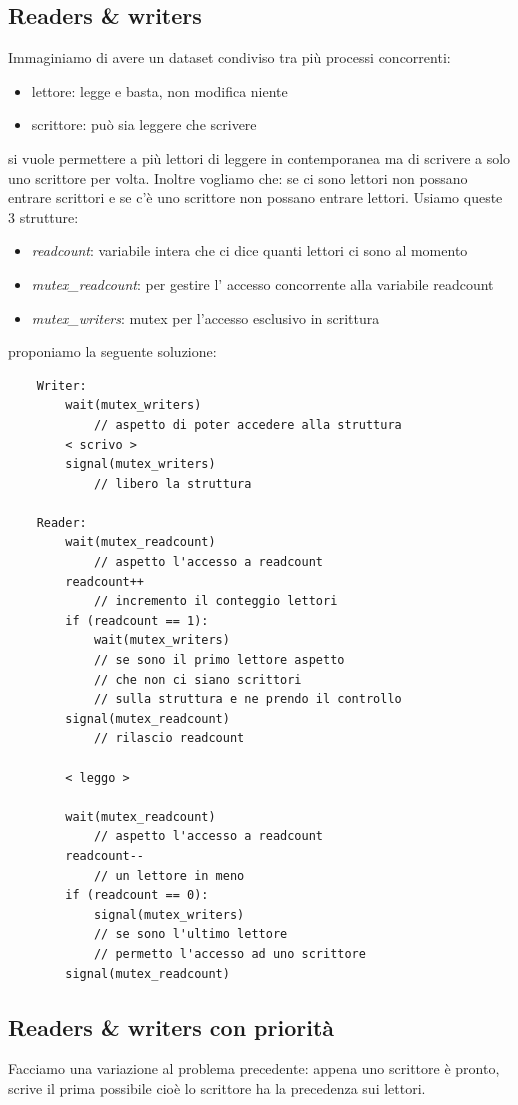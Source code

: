 \subsection{Readers \& writers}
Immaginiamo di avere un dataset condiviso tra più processi concorrenti:
\begin{itemize}
    \item lettore: legge e basta, non modifica niente
    \item scrittore: può sia leggere che scrivere
\end{itemize}
si vuole permettere a più lettori di leggere in contemporanea ma di scrivere a solo uno scrittore per volta.
Inoltre vogliamo che: se ci sono lettori non possano entrare scrittori e se c'è uno scrittore non possano entrare lettori.
Usiamo queste 3 strutture:
\begin{itemize}
    \item \emph{readcount}: variabile intera che ci dice quanti lettori ci sono al momento
    \item \emph{mutex\_readcount}: per gestire l' accesso concorrente alla variabile readcount
    \item \emph{mutex\_writers}: mutex per l'accesso esclusivo in scrittura
\end{itemize}
proponiamo la seguente soluzione:
\begin{verbatim}
    Writer:
        wait(mutex_writers)
            // aspetto di poter accedere alla struttura
        < scrivo >
        signal(mutex_writers)
            // libero la struttura

    Reader:
        wait(mutex_readcount)
            // aspetto l'accesso a readcount
        readcount++
            // incremento il conteggio lettori
        if (readcount == 1):
            wait(mutex_writers)
            // se sono il primo lettore aspetto
            // che non ci siano scrittori
            // sulla struttura e ne prendo il controllo
        signal(mutex_readcount)
            // rilascio readcount
        
        < leggo >
        
        wait(mutex_readcount)
            // aspetto l'accesso a readcount
        readcount--
            // un lettore in meno
        if (readcount == 0):
            signal(mutex_writers)
            // se sono l'ultimo lettore
            // permetto l'accesso ad uno scrittore
        signal(mutex_readcount)
\end{verbatim}

\subsection{Readers \& writers con priorità}
Facciamo una variazione al problema precedente: appena uno scrittore è pronto, scrive il prima possibile cioè lo scrittore ha la precedenza sui lettori.


